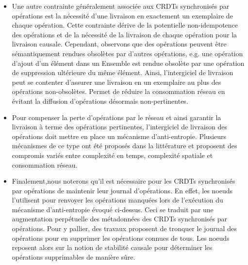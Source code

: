 \documentclass[12pt]{thesul}
\newcommand{\eg}{e.g. }
\begin{document}
\begin{itemize}
{    }.
    Mais dans certains cas, observons que la livraison causale de toutes les opérations n'est pas nécessaire \eg l'ordre d'intégration de deux opérations d'ajout d'éléments différents dans un Ensemble n'a pas d'importance.
    Pouvons alors nous affranchir de la livraison causale pour accélérer la vitesse d'intégration des modifications et pour réduire métadonnées envoyées.
  \item Une autre contrainte généralement associée aux \acp{CRDT} synchronisés par opérations est la nécessité d'une livraison en exactement un exemplaire de chaque opération.
   Cette contrainte dérive de la potentielle non-idempotence des opérations et de la nécessité de la livraison de chaque opération pour la livraison causale.
    Cependant, observons que des opérations peuvent être sémantiquement rendues obsolètes par d'autres opérations, \eg une opération d'ajout d'un élément dans un Ensemble est rendue obsolète par une opération de suppression ultérieure du même élément.
    Ainsi, l'intergiciel de livraison peut se contenter d'assurer une livraison en un exemplaire au plus des opérations non-obsolètes.
    Permet de réduire la consommation réseau en évitant la diffusion d'opérations désormais non-pertinentes.
  \item Pour compenser la perte d'opérations par le réseau et ainsi garantir la livraison à terme des opérations pertinentes, l'intergiciel de livraison des opérations doit mettre en place un mécanisme d'anti-entropie.
    Plusieurs mécanismes de ce type ont été proposés dans la littérature \cite{1983-anti-entropy-vv, 2007-dynamo, 2015-approximate-hash-based-set-reconciliation, 2017-anti-entropy-without-merkle-trees}  et proposent des compromis variés entre complexité en temps, complexité spatiale et consommation réseau.
  \item Finalement,nous noterons qu'il est nécessaire pour les \acp{CRDT} synchronisés par opérations de maintenir leur journal d'opérations.
    En effet, les noeuds l'utilisent pour renvoyer les opérations manquées lors de l'exécution du mécanisme d'anti-entropie évoqué ci-dessus.
    Ceci se traduit par une augmentation perpétuelle des métadonnées des \acp{CRDT} synchronisés par opérations.
    Pour y pallier, des travaux \cite{baquero2017pure, 2021-improving-reactivity-pure-op-based-crdts-bauwens} proposent de tronquer le journal des opérations pour en supprimer les opérations connues de tous.
    Les noeuds reposent alors sur la notion de stabilité causale pour déterminer les opérations supprimables de manière sûre.

\end{itemize}
\end{document}
